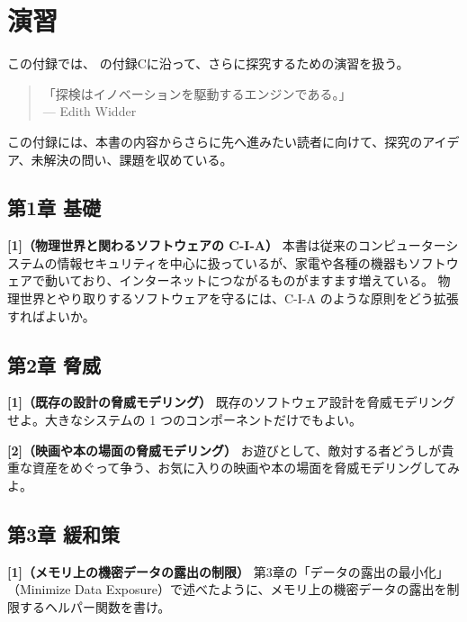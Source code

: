 \documentclass[uplatex]{jsarticle}
\def\label#1{}%
\begin{document}
\section{演習}\label{sec:appc-exercises}

この付録では、\cite{Kohnfelder2021} の付録Cに沿って、さらに探究するための演習を扱う。

\begin{quote}
「探検はイノベーションを駆動するエンジンである。」\\
\hfill --- Edith Widder
\end{quote}

この付録には、本書の内容からさらに先へ進みたい読者に向けて、探究のアイデア、未解決の問い、課題を収めている。

\subsection{第1章 基礎}

\noindent\textbf{[1]（物理世界と関わるソフトウェアの C-I-A）}\quad
本書は従来のコンピューターシステムの情報セキュリティを中心に扱っているが、家電や各種の機器もソフトウェアで動いており、インターネットにつながるものがますます増えている。
物理世界とやり取りするソフトウェアを守るには、C-I-A のような原則をどう拡張すればよいか。

\subsection{第2章 脅威}

\noindent\textbf{[1]（既存の設計の脅威モデリング）}\quad
既存のソフトウェア設計を脅威モデリングせよ。大きなシステムの 1 つのコンポーネントだけでもよい。

\noindent\textbf{[2]（映画や本の場面の脅威モデリング）}\quad
お遊びとして、敵対する者どうしが貴重な資産をめぐって争う、お気に入りの映画や本の場面を脅威モデリングしてみよ。

\subsection{第3章 緩和策}

\noindent\textbf{[1]（メモリ上の機密データの露出の制限）}\quad
第3章の「データの露出の最小化」（Minimize Data Exposure）で述べたように、メモリ上の機密データの露出を制限するヘルパー関数を書け。
\end{document}
